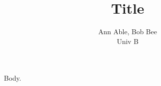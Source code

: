 \documentclass{article}
\title{Title}
\author{Ann Able\corresp{\email{ann@able.org}}, Bob Bee\\ Univ B\\ \email{bob@bee.org}}
\begin{document}
\maketitle
Body.
\end{document}
